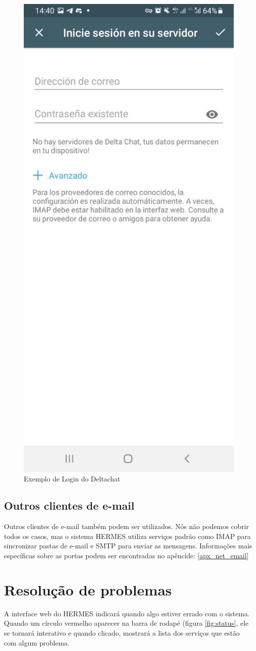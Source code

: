 \documentclass[11pt,a4paper]{article}
\begin{document}
\begin{figure}[H]
    \centering
    \includegraphics[width=0.3\columnwidth]{screenshots/deltachat/es/login_es.jpeg}
    	\caption{Exemplo de Login do Deltachat}
	\vspace{-10pt}
    \label{fig:deltachat-login}
\end{figure}

\subsection{Outros clientes de e-mail}

Outros clientes de e-mail também podem ser utilizados. Nós não podemos cobrir todos os casos, mas o sistema HERMES utiliza serviços padrão como IMAP para sincronizar pastas de e-mail e SMTP para enviar as mensagens. Informações mais específicas sobre as portas podem ser encontradas no apêncide: \ref{apx_net_email}


\section{Resolução de problemas}

A interface web do HERMES indicará quando algo estiver errado com o sistema. Quando um círculo vermelho aparecer na barra de rodapé (figura \ref{fig:status}, ele se tornará interativo e quando clicado, mostrará a lista dos serviços que estão com algum problema.
\end{document}
